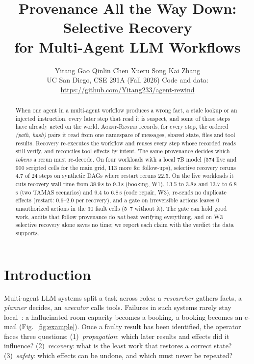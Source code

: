 \documentclass[10pt,twocolumn,letterpaper]{article}
\title{\Large\bfseries Provenance All the Way Down: Selective Recovery\\for Multi-Agent LLM Workflows}
\author{Yitang Gao \quad Qinlin Chen \quad Xueru Song \quad Kai Zhang\\ \normalsize UC San Diego, CSE 291A (Fall 2026) \quad Code and data: \url{https://github.com/Yitang233/agent-rewind}}
\date{}
\newcommand{\sys}{\textsc{Agent-Rewind}}
\begin{document}
\maketitle

\begin{abstract}
When one agent in a multi-agent workflow produces a wrong fact, a stale lookup or
an injected instruction, every later step that read it is suspect, and some of
those steps have already acted on the world. \sys{} records, for every step, the
ordered \emph{(path, hash)} pairs it read from one namespace of messages, shared
state, files and tool results. Recovery re-executes the workflow and reuses every
step whose recorded reads still verify, and reconciles tool effects by intent.
The same provenance decides which \emph{tokens} a rerun must re-decode.
On four workloads with a local 7B model (574 live and 900 scripted cells for the
main grid, 113 more for follow-ups), selective recovery reruns 4.7 of 24 steps on
synthetic DAGs where restart reruns 22.5. On the live workloads it cuts recovery
wall time from 38.9\,s to 9.3\,s (booking, W1), 13.5 to 3.8\,s and 13.7 to
6.8\,s (two TAMAS scenarios) and 9.4 to 6.8\,s (code repair, W3), re-sends no
duplicate effects (restart: 0.6--2.0 per recovery), and a gate on irreversible
actions leaves 0 unauthorized actions in the 30 fault cells (5--7 without it).
The gate can hold good work, audits that follow provenance do \emph{not} beat
verifying everything, and on W3 selective recovery alone saves no time; we report
each claim with the verdict the data supports.
\end{abstract}

\section{Introduction}

Multi-agent LLM systems split a task across roles: a \emph{researcher} gathers
facts, a \emph{planner} decides, an \emph{executor} calls tools. Failures in such
systems rarely stay local~\cite{cemri2025why,huang2025resilience}: a hallucinated
room capacity becomes a booking, a booking becomes an e-mail
(Fig.~\ref{fig:example}). Once a faulty result has been identified, the operator
faces three questions:
(1)~\emph{propagation}: which later results and effects did it influence?
(2)~\emph{recovery}: what is the least work that restores a correct state?
(3)~\emph{safety}: which effects can be undone, and which must never be repeated?
\end{document}
